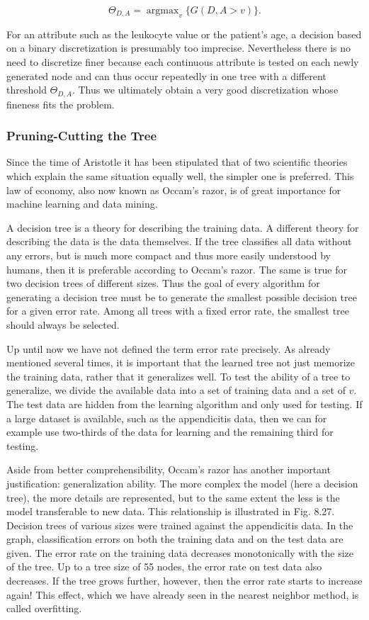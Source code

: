 \documentclass[10pt]{book}
\begin{document}
$$
\Theta_{D, A}=\operatorname{argmax}_{v}\{G(D, A>v)\} .
$$

For an attribute such as the leukocyte value or the patient's age, a decision based on a binary discretization is presumably too imprecise. Nevertheless there is no need to discretize finer because each continuous attribute is tested on each newly generated node and can thus occur repeatedly in one tree with a different threshold $\Theta_{D, A}$. Thus we ultimately obtain a very good discretization whose fineness fits the problem.

\subsubsection*{Pruning-Cutting the Tree}
Since the time of Aristotle it has been stipulated that of two scientific theories which explain the same situation equally well, the simpler one is preferred. This law of economy, also now known as Occam's razor, is of great importance for machine learning and data mining.


A decision tree is a theory for describing the training data. A different theory for describing the data is the data themselves. If the tree classifies all data without any errors, but is much more compact and thus more easily understood by humans, then it is preferable according to Occam's razor. The same is true for two decision trees of different sizes. Thus the goal of every algorithm for generating a decision tree must be to generate the smallest possible decision tree for a given error rate. Among all trees with a fixed error rate, the smallest tree should always be selected.

Up until now we have not defined the term error rate precisely. As already mentioned several times, it is important that the learned tree not just memorize the training data, rather that it generalizes well. To test the ability of a tree to generalize, we divide the available data into a set of training data and a set of $v$. The test data are hidden from the learning algorithm and only used for testing. If a large dataset is available, such as the appendicitis data, then we can for example use two-thirds of the data for learning and the remaining third for testing.

Aside from better comprehensibility, Occam's razor has another important justification: generalization ability. The more complex the model (here a decision tree), the more details are represented, but to the same extent the less is the model transferable to new data. This relationship is illustrated in Fig. 8.27. Decision trees of various sizes were trained against the appendicitis data. In the graph, classification errors on both the training data and on the test data are given. The error rate on the training data decreases monotonically with the size of the tree. Up to a tree size of 55 nodes, the error rate on test data also decreases. If the tree grows further, however, then the error rate starts to increase again! This effect, which we have already seen in the nearest neighbor method, is called overfitting.
\end{document}
